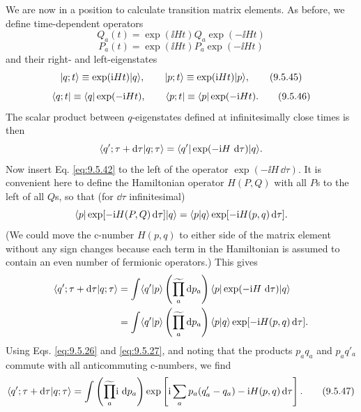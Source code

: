 We are now in a position to calculate transition matrix elements. As before,
we define time-dependent operators
\begin{equation}
Q_a(t)=\exp(\ii Ht)Q_a\exp(-\ii Ht)
\tag{9.5.43}\label{eq:9.5.43}
\end{equation}
\begin{equation}
P_a(t)=\exp(\ii Ht)P_a\exp(-\ii Ht)
\tag{9.5.44}\label{eq:9.5.44}
\end{equation}
and their right- and left-eigenstates
\begin{equation}
\lvert q;t\rangle\equiv\exp(\mathrm{i} Ht)\lvert q\rangle,
\qquad
\lvert p;t\rangle\equiv\exp(\mathrm{i} Ht)\lvert p\rangle,
\tag{9.5.45}\label{eq:9.5.45}
\end{equation}
\begin{equation}
\langle q;t\rvert\equiv\langle q\rvert\exp(-\mathrm{i} Ht),
\qquad
\langle p;t\rvert\equiv\langle p\rvert\exp(-\mathrm{i} Ht).
\tag{9.5.46}\label{eq:9.5.46}
\end{equation}
The scalar product between $q$-eigenstates defined at infinitesimally close
times is then
\[
\langle q';\tau+\mathop{}\!\mathrm{d}\tau | q;\tau\rangle
=\langle q'\rvert\exp(-\mathrm{i} H\,\mathop{}\!\mathrm{d}\tau)\lvert q\rangle.
\]
Now insert Eq. \eqref{eq:9.5.42} to the left of the operator $\exp(-\ii H\,\dd\tau)$. It is
convenient here to define the Hamiltonian operator $H(P,Q)$ with all $P$s to
the left of all $Q$s, so that (for $\dd\tau$ infinitesimal)
\[
\langle p\rvert\exp[-\mathrm{i} H(P,Q)\mathop{}\!\mathrm{d}\tau]\lvert q\rangle
=\langle p | q\rangle\exp[-\mathrm{i} H(p,q)\mathop{}\!\mathrm{d}\tau].
\]
(We could move the c-number $H(p,q)$ to either side of the matrix element
without any sign changes because each term in the Hamiltonian is assumed to
contain an even number of fermionic operators.) This gives
\begin{align*}
\langle q';\tau+\mathop{}\!\mathrm{d}\tau | q;\tau\rangle
&=\int\langle q' | p\rangle
 \left(\widetilde{\prod_a}\mathop{}\!\mathrm{d} p_a\right)
 \langle p\rvert\exp(-\mathrm{i} H\,\mathop{}\!\mathrm{d}\tau)\lvert q\rangle\\
&=\int\langle q' | p\rangle
 \left(\widetilde{\prod_a}\mathop{}\!\mathrm{d} p_a\right)\langle p | q\rangle
 \exp[-\mathrm{i} H(p,q)\mathop{}\!\mathrm{d}\tau].
\end{align*}
Using Eqs. \eqref{eq:9.5.26} and \eqref{eq:9.5.27}, and noting that the products $p_aq_a$ and
$p_aq'_a$ commute with all anticommuting c-numbers, we find
\begin{equation}
\langle q';\tau+\mathop{}\!\mathrm{d}\tau | q;\tau\rangle
=\int\left(\widetilde{\prod_a}\mathrm{i}\,\mathop{}\!\mathrm{d} p_a\right)
 \exp\left[\mathrm{i}\sum_ap_a(q'_a-q_a)-\mathrm{i} H(p,q)\mathop{}\!\mathrm{d}\tau\right].
\tag{9.5.47}\label{eq:9.5.47}
\end{equation}

